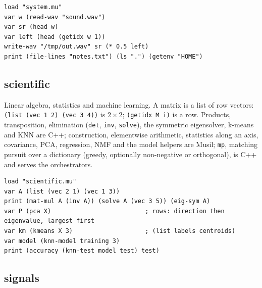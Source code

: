 \documentclass[11pt,a4paper]{article}
\newcommand{\musil}[1]{\lstinline[style=musilinline]{#1}}
\begin{document}
\begin{lstlisting}
load "system.mu"
var w (read-wav "sound.wav")
var sr (head w)
var left (head (getidx w 1))
write-wav "/tmp/out.wav" sr (* 0.5 left)
print (file-lines "notes.txt") (ls ".") (getenv "HOME")
\end{lstlisting}



\subsection{scientific}

Linear algebra, statistics and machine learning. A matrix is a list of row vectors:
\musil{(list (vec 1 2) (vec 3 4))} is $2\times2$; \musil{(getidx M i)} is a row.
Products, transposition, elimination (\musil{det}, \musil{inv}, \musil{solve}), the
symmetric eigensolver, k-means and KNN are C++; construction, elementwise arithmetic,
statistics along an axis, covariance, PCA, regression, NMF and the model helpers are Musil;
\musil{mp}, matching pursuit over a dictionary (greedy, optionally non-negative or
orthogonal), is C++ and serves the orchestrators.

\begin{lstlisting}
load "scientific.mu"
var A (list (vec 2 1) (vec 1 3))
print (mat-mul A (inv A)) (solve A (vec 3 5)) (eig-sym A)
var P (pca X)                          ; rows: direction then eigenvalue, largest first
var km (kmeans X 3)                    ; (list labels centroids)
var model (knn-model training 3)
print (accuracy (knn-test model test) test)
\end{lstlisting}



\subsection{signals}
\end{document}
